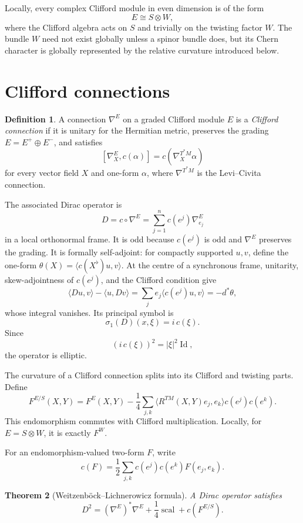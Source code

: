 \documentclass[11pt,oneside,reqno]{book}
\theoremstyle{plain}
\newtheorem{theorem}{Theorem}[chapter]
\theoremstyle{definition}
\newtheorem{definition}[theorem]{Definition}
\theoremstyle{remark}
\begin{document}
Locally, every complex Clifford module in even dimension is of the form
\[
 E\cong S\otimes W,
\]
where the Clifford algebra acts on \(S\) and trivially on the twisting
factor \(W\). The bundle \(W\) need not exist globally unless a spinor
bundle does, but its Chern character is globally represented by the
relative curvature introduced below.

\section{Clifford connections}

\begin{definition}\label{def:clifford-connection}
A connection \(\nabla^E\) on a graded Clifford module \(E\) is a
\emph{Clifford connection} if it is unitary for the Hermitian metric,
preserves the grading \(E=E^+\oplus E^-\), and satisfies
\[
 [\nabla_X^E,c(\alpha)]
 =
 c(\nabla_X^{T^*M}\alpha)
\]
for every vector field \(X\) and one-form \(\alpha\), where
\(\nabla^{T^*M}\) is the Levi--Civita connection.
\end{definition}

The associated Dirac operator is
\[
 D=c\circ\nabla^E
 =\sum_{j=1}^n c(e^j)\nabla_{e_j}^E
\]
in a local orthonormal frame. It is odd because \(c(e^j)\) is odd and
\(\nabla^E\) preserves the grading.  It is formally self-adjoint: for
compactly supported \(u,v\), define the one-form
\(\theta(X)=\langle c(X^\flat)u,v\rangle\).  At the centre of a
synchronous frame, unitarity, skew-adjointness of \(c(e^j)\), and the
Clifford condition give
\[
 \langle Du,v\rangle-\langle u,Dv\rangle
 =\sum_j e_j\langle c(e^j)u,v\rangle
 =-d^*\theta,
\]
whose integral vanishes.  Its principal symbol is
\[
 \sigma_1(D)(x,\xi)=i\,c(\xi).
\]
Since
\[
 (i\,c(\xi))^2=|\xi|^2\operatorname{Id},
\]
the operator is elliptic.

The curvature of a Clifford connection splits into its Clifford and
twisting parts. Define
\[
 F^{E/S}(X,Y)
 =
 F^E(X,Y)
 -\frac14\sum_{j,k}
 \langle R^{TM}(X,Y)e_j,e_k\rangle c(e^j)c(e^k).
\]
This endomorphism commutes with Clifford multiplication. Locally, for
\(E=S\otimes W\), it is exactly \(F^W\).

For an endomorphism-valued two-form \(F\), write
\[
 c(F)=\frac12\sum_{j,k}c(e^j)c(e^k)F(e_j,e_k).
\]

\begin{theorem}[Weitzenböck--Lichnerowicz formula]
A Dirac operator satisfies
\[
 D^2
 =
 (\nabla^E)^*\nabla^E
 +\frac14\operatorname{scal}
 +c(F^{E/S}).
\]
\end{theorem}
\end{document}
